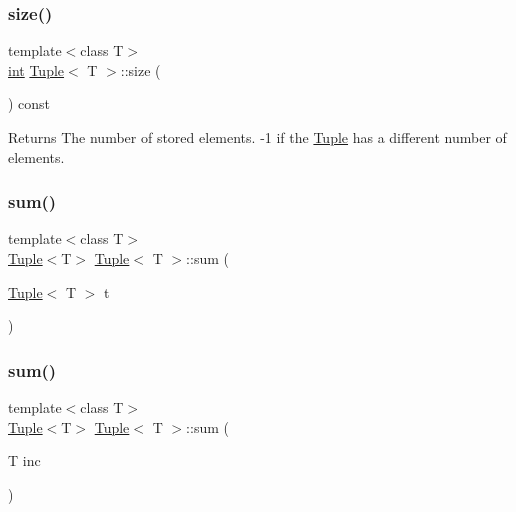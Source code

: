 \subsubsection{\texorpdfstring{size()}{size()}}
{\footnotesize\ttfamily template$<$class T$>$ \\
\mbox{\hyperlink{draw_8hh_aa620a13339ac3a1177c86edc549fda9b}{int}} \mbox{\hyperlink{class_tuple}{Tuple}}$<$ T $>$\+::size (\begin{DoxyParamCaption}{ }\end{DoxyParamCaption}) const\hspace{0.3cm}{\ttfamily [inline]}}

\begin{DoxyReturn}{Returns}
The number of stored elements. -\/1 if the \mbox{\hyperlink{class_tuple}{Tuple}} has a different number of elements. 
\end{DoxyReturn}
\mbox{\label{class_tuple_a2b595ce33576c6fcb36d74b46f0a7c55}} 
\subsubsection{\texorpdfstring{sum()}{sum()}\hspace{0.1cm}{\footnotesize\ttfamily [1/2]}}
{\footnotesize\ttfamily template$<$class T$>$ \\
\mbox{\hyperlink{class_tuple}{Tuple}}$<$T$>$ \mbox{\hyperlink{class_tuple}{Tuple}}$<$ T $>$\+::sum (\begin{DoxyParamCaption}\item[{\mbox{\hyperlink{class_tuple}{Tuple}}$<$ T $>$}]{t }\end{DoxyParamCaption})\hspace{0.3cm}{\ttfamily [inline]}}

\mbox{\label{class_tuple_a20daa0804e2bac28949b5abe0cbcc589}} 
\subsubsection{\texorpdfstring{sum()}{sum()}\hspace{0.1cm}{\footnotesize\ttfamily [2/2]}}
{\footnotesize\ttfamily template$<$class T$>$ \\
\mbox{\hyperlink{class_tuple}{Tuple}}$<$T$>$ \mbox{\hyperlink{class_tuple}{Tuple}}$<$ T $>$\+::sum (\begin{DoxyParamCaption}\item[{T}]{inc }\end{DoxyParamCaption})\hspace{0.3cm}{\ttfamily [inline]}}

